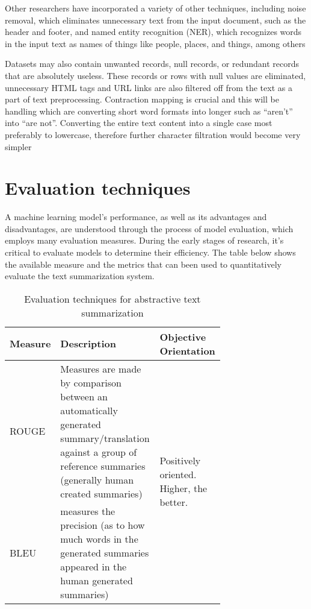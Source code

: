 \documentclass[manuscript,screen,natbib=false]{acmart}
\begin{document}
Other researchers have incorporated a variety of other techniques, including noise removal, which eliminates unnecessary text from the input document, such as the header and footer, and named entity recognition (NER), which recognizes words in the input text as names of things like people, places, and things, among others \cite{barna_heickal_2022}

Datasets may also contain unwanted records, null records, or redundant records that are absolutely useless. These records or rows with null values are eliminated, unnecessary HTML tags and URL links are also filtered off from the text as a part of text preprocessing. Contraction mapping is crucial and this will be handling which are converting short word formats into longer such as “aren’t” into “are not”. Converting the entire text content into a single case most preferably to lowercase, therefore further character filtration would become very simpler \cite{etemad_abidi_chhabra_2021}

\section{Evaluation techniques}
A machine learning model's performance, as well as its advantages and disadvantages, are understood through the process of model evaluation, which employs many evaluation measures. During the early stages of research, it's critical to evaluate models to determine their efficiency.
The table below shows the available measure and the metrics that can been used to quantitatively evaluate the text summarization system. 

\begin{table}[h]
\caption{Evaluation techniques for abstractive text summarization}
\label{tab:evaluation-techniques-table}
\centering
\begin{tabular}{|l|p{0.5\linewidth}|p{0.21\linewidth}|}
\hline
Measure & Description & Objective Orientation \\
\hline
ROUGE & Measures are made by comparison between an automatically generated summary/translation against a group of reference summaries (generally human created summaries) & \multirow{2}{=}{Positively oriented. Higher, the better.} \\ 
\cline{1-2}
BLEU & measures the precision (as to how much words in the generated summaries appeared in the human generated summaries) & \\
\hline 
\end{tabular}
\end{table}
\end{document}
